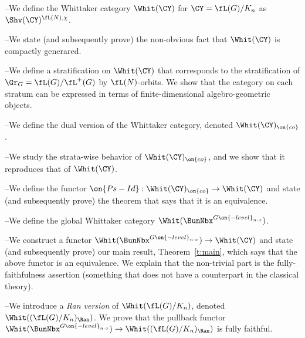 \documentclass[9pt]{amsart}
\theoremstyle{definition}
\theoremstyle{remark}
\newcommand{\thmref}[1]{Theorem~\ref{#1}}
\numberwithin{equation}{section}
\begin{document}
 \hfill

\medskip

\noindent--We define the Whittaker category $\Whit(\CY)$ for $\CY=\fL(G)/K_n$ as $\Shv(\CY)^{\fL(N),\chi}$. 

\smallskip

\noindent--We state (and subsequently prove) the non-obvious fact that $\Whit(\CY)$ is compactly generared. 

\smallskip

\noindent--We define a stratification on $\Whit(\CY)$ that corresponds to the stratification of $\Gr_G=\fL(G)/\fL^+(G)$
by $\fL(N)$-orbits. We show that the category on each stratum can be expressed in terms of finite-dimensional 
algebro-geometric objects. 

 \hfill

\medskip

\noindent--We define the dual version of the Whittaker category, denoted $\Whit(\CY)_{\on{co}}$.  

\smallskip

\noindent--We study the strata-wise behavior of $\Whit(\CY)_{\on{co}}$, and we show that it reproduces that of 
$\Whit(\CY)$.

\smallskip

\noindent--We define the functor $\on{Ps-Id}:\Whit(\CY)_{\on{co}}\to \Whit(\CY)$ and state (and subsequently prove)
the theorem that says that it is an equivalence. 

 \hfill

\medskip

\noindent--We define the global Whittaker category $\Whit(\BunNbx^{G\on{-level}_{n\cdot x}})$. 

\medskip

\noindent--We construct a functor $\Whit(\BunNbx^{G\on{-level}_{n\cdot x}})\to \Whit(\CY)$ and state (and subsequently prove)
our main result, \thmref{t:main}, which says that the above functor is an equivalence. We explain that the non-trivial
part is the fully-faithfulness assertion (something that does not have a counterpart in the classical theory). 

\medskip

\noindent--We introduce a \emph{Ran version} of $\Whit(\fL(G)/K_n)$, denoted $\Whit((\fL(G)/K_n)_{\Ran})$. We prove that the pullback
functor $\Whit(\BunNbx^{G\on{-level}_{n\cdot x}})\to \Whit((\fL(G)/K_n)_{\Ran})$ is fully faithful. 
 
\end{document}
